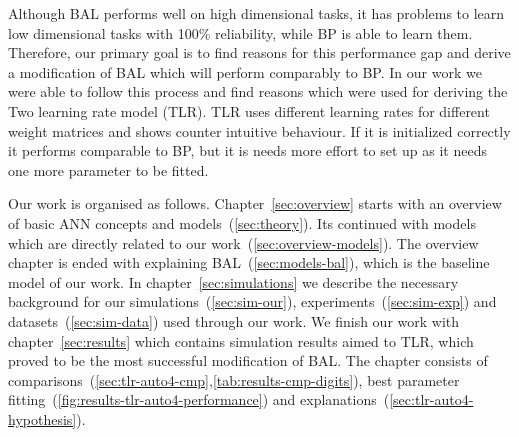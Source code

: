 

Although BAL performs well on high dimensional tasks, it has problems to learn low dimensional tasks with 100\% reliability, while BP is able to learn them. Therefore, our primary goal is to find reasons for this performance gap and derive a modification of BAL which will perform comparably to BP. In our work we were able to follow this process and find reasons which were used for deriving the Two learning rate model (TLR). TLR uses different learning rates for different weight matrices and shows counter intuitive behaviour. If it is initialized correctly it performs comparable to BP, but it is needs more effort to set up as it needs one more parameter to be fitted. 


Our work is organised as follows. Chapter~\ref{sec:overview} starts with an overview of basic ANN concepts and models~(\ref{sec:theory}). Its continued with models which are directly related to our work~(\ref{sec:overview-models}). The overview chapter is ended with explaining BAL~(\ref{sec:models-bal}), which is the baseline model of our work. In chapter~\ref{sec:simulations} we describe the necessary background for our simulations~(\ref{sec:sim-our}), experiments~(\ref{sec:sim-exp}) and datasets~(\ref{sec:sim-data}) used through our work. We finish our work with chapter~\ref{sec:results} which contains simulation results aimed to TLR, which proved to be the most successful modification of BAL. The chapter consists of comparisons~(\ref{sec:tlr-auto4-cmp},\ref{tab:results-cmp-digits}), best parameter fitting~(\ref{fig:results-tlr-auto4-performance}) and explanations~(\ref{sec:tlr-auto4-hypothesis}). %




